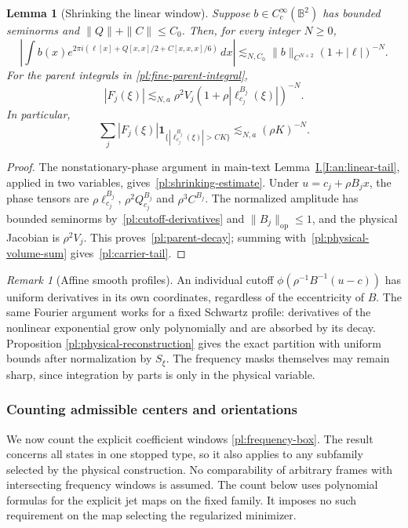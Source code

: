 \documentclass[11pt]{amsart}
\newtheorem{lemma}[theorem]{Lemma}
\theoremstyle{definition}
\theoremstyle{remark}
\newtheorem{remark}[theorem]{Remark}
\numberwithin{equation}{section}
\newcommand{\partIref}[1]{\hyperref[I:#1]{I.\ref*{I:#1}}}
\begin{document}
\begin{lemma}[Shrinking the linear window]\label{pl:shrinking}
Suppose $b\in C_c^\infty(\mathbb B^2)$ has bounded seminorms and $\|Q\|+\|C\|\le C_0$. Then, for every integer $N\ge0$,
\begin{equation}\label{pl:shrinking-estimate}
\left|\int b(x)e^{2\pi i(\ell[x]+Q[x,x]/2+C[x,x,x]/6)}\,dx\right|
\lesssim_{N,C_0} \|b\|_{C^{N+2}}(1+|\ell|)^{-N}.
\end{equation}
For the parent integrals in \eqref{pl:fine-parent-integral},
\begin{equation}\label{pl:parent-decay}
|F_j(\xi)|\lesssim_{N,a} \rho^2V_j(1+\rho|\ell_{c_j}^{B_j}(\xi)|)^{-N}.
\end{equation}
In particular,
\begin{equation}\label{pl:carrier-tail}
\sum_j|F_j(\xi)|\mathbf1_{\{|\ell_{c_j}^{B_j}(\xi)|>C K\}}
\lesssim_{N,a} (\rho K)^{-N}.
\end{equation}
\end{lemma}

\begin{proof}
The nonstationary-phase argument in main-text Lemma~\partIref{an:linear-tail}, applied in two variables, gives~\eqref{pl:shrinking-estimate}. Under $u=c_j+\rho B_jx$, the phase tensors are $\rho\ell_{c_j}^{B_j}$, $\rho^2Q_{c_j}^{B_j}$ and $\rho^3C^{B_j}$. The normalized amplitude has bounded seminorms by~\eqref{pl:cutoff-derivatives} and $\|B_j\|_{\mathrm{op}}\le1$, and the physical Jacobian is $\rho^2V_j$. This proves~\eqref{pl:parent-decay}; summing with~\eqref{pl:physical-volume-sum} gives~\eqref{pl:carrier-tail}.
\end{proof}

\begin{remark}[Affine smooth profiles]
An individual cutoff $\phi(\rho^{-1}B^{-1}(u-c))$ has uniform derivatives in its own coordinates, regardless of the eccentricity of $B$. The same Fourier argument works for a fixed Schwartz profile: derivatives of the nonlinear exponential grow only polynomially and are absorbed by its decay. Proposition \ref{pl:physical-reconstruction} gives the exact partition with uniform bounds after normalization by $S_\xi$. The frequency masks themselves may remain sharp, since integration by parts is only in the physical variable.
\end{remark}

\subsubsection{Counting admissible centers and orientations}\label{pl:coupled-overlap-section}
We now count the explicit coefficient windows \eqref{pl:frequency-box}. The result concerns all states in one stopped type, so it also applies to any subfamily selected by the physical construction. No comparability of arbitrary frames with intersecting frequency windows is assumed. The count below uses polynomial formulas for the explicit jet maps on the fixed family. It imposes no such requirement on the map selecting the regularized minimizer.
\end{document}
